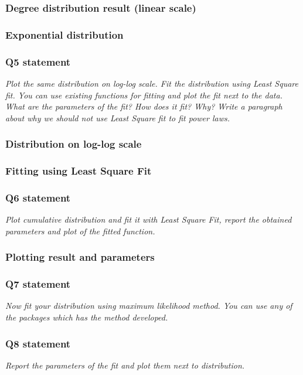 \documentclass{article}
\begin{document}
\subsubsection*{Degree distribution result (linear scale)} 

\subsubsection*{Exponential distribution} 

\subsubsection{Q5 statement}
\textit{Plot the same distribution on log-log scale. Fit the distribution using Least Square fit. You can use existing functions for fitting and plot the fit next to the data. What are the parameters of the fit? How does it fit? Why? Write a paragraph about why we should not use Least Square fit to fit power laws.}

\subsubsection*{Distribution on log-log scale} 

\subsubsection*{Fitting using Least Square Fit} 

\subsubsection{Q6 statement}
\textit{Plot cumulative distribution and fit it with Least Square Fit, report the obtained parameters and plot of the fitted function.}

\subsubsection*{Plotting result and parameters} 

\subsubsection{Q7 statement}
\textit{Now fit your distribution using maximum likelihood method. You can use any of the packages which has the method developed.}

\subsubsection{Q8 statement}
\textit{Report the parameters of the fit and plot them next to distribution.}
\end{document}
